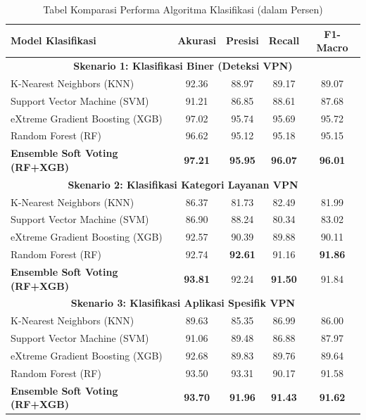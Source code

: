 \begin{table}[H]
    \centering
    \footnotesize
    \caption{Tabel Komparasi Performa Algoritma Klasifikasi (dalam Persen)}
    \label{tab:komparasi_model}
    \begin{tabular}{l cccc}
        \toprule
        \textbf{Model Klasifikasi} & \textbf{Akurasi} & \textbf{Presisi} & \textbf{Recall} & \textbf{F1-Macro} \\
        \midrule
        \multicolumn{5}{c}{\textbf{Skenario 1: Klasifikasi Biner (Deteksi VPN)}} \\
        \midrule
        K-Nearest Neighbors (KNN) & 92.36 & 88.97 & 89.17 & 89.07 \\
        Support Vector Machine (SVM) & 91.21 & 86.85 & 88.61 & 87.68 \\
        eXtreme Gradient Boosting (XGB) & 97.02 & 95.74 & 95.69 & 95.72 \\
        Random Forest (RF) & 96.62 & 95.12 & 95.18 & 95.15 \\
        \textbf{Ensemble Soft Voting (RF+XGB)} & \textbf{97.21} & \textbf{95.95} & \textbf{96.07} & \textbf{96.01} \\
        \midrule
        \multicolumn{5}{c}{\textbf{Skenario 2: Klasifikasi Kategori Layanan VPN}} \\
        \midrule
        K-Nearest Neighbors (KNN) & 86.37 & 81.73 & 82.49 & 81.99 \\
        Support Vector Machine (SVM) & 86.90 & 88.24 & 80.34 & 83.02 \\
        eXtreme Gradient Boosting (XGB) & 92.57 & 90.39 & 89.88 & 90.11 \\
        Random Forest (RF) & 92.74 & \textbf{92.61} & 91.16 & \textbf{91.86} \\
        \textbf{Ensemble Soft Voting (RF+XGB)} & \textbf{93.81} & 92.24 & \textbf{91.50} & 91.84 \\
        \midrule
        \multicolumn{5}{c}{\textbf{Skenario 3: Klasifikasi Aplikasi Spesifik VPN}} \\
        \midrule
        K-Nearest Neighbors (KNN) & 89.63 & 85.35 & 86.99 & 86.00 \\
        Support Vector Machine (SVM) & 91.06 & 89.48 & 86.88 & 87.97 \\
        eXtreme Gradient Boosting (XGB) & 92.68 & 89.83 & 89.76 & 89.64 \\
        Random Forest (RF) & 93.50 & 93.31 & 90.17 & 91.58 \\
        \textbf{Ensemble Soft Voting (RF+XGB)} & \textbf{93.70} & \textbf{91.96} & \textbf{91.43} & \textbf{91.62} \\
        \bottomrule
    \end{tabular}%
\end{table}

